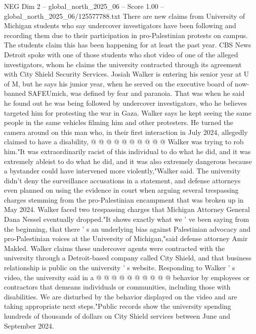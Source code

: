 \begin{textsample}{NEG Dim 2 – global\_north\_2025\_06 – Score 1.00 – global\_north\_2025\_06/125577788.txt}  \label{ex:f2_neg_085}
There are new claims from University of Michigan students who say undercover investigators have been following and recording them due to their participation in pro-Palestinian protests on campus.
The students claim this has been happening for at least the past year.
CBS News Detroit spoke with one of those students who shot video of one of the alleged investigators, whom he claims the university contracted through its agreement with City Shield Security Services.
Josiah Walker is entering his senior year at U of M, but he says his junior year, when he served on the executive board of now-banned SAFEUmich, was defined by fear and paranoia.
That was when he said he found out he was being followed by undercover investigators, who he believes targeted him for protesting the war in Gaza.
Walker says he kept seeing the same people in the same vehicles filming him and other protesters.
He turned the camera around on this man who, in their first interaction in July 2024, allegedly claimed to have a disability, @ @ @ @ @ @ @ @ @ @ Walker was trying to rob him."It was extraordinarily racist of this individual to do what he did, and it was extremely ableist to do what he did, and it was also extremely dangerous because a bystander could have intervened more violently,"Walker said.
The university didn't deny the surveillance accusations in a statement, and defense attorneys even planned on using the evidence in court when arguing several trespassing charges stemming from the pro-Palestinian encampment that was broken up in May 2024.
Walker faced two trespassing charges that Michigan Attorney General Dana Nessel eventually dropped."It shows exactly what we ' ve been saying from the beginning, that there ' s an underlying bias against Palestinian advocacy and pro-Palestinian voices at the University of Michigan,"said defense attorney Amir Makled.
Walker claims these undercover agents were contracted with the university through a Detroit-based company called City Shield, and that business relationship is public on the university ' s website.
Responding to Walker ' s video, the university said in a @ @ @ @ @ @ @ @ @ @ behavior by employees or contractors that demeans individuals or communities, including those with disabilities.
We are disturbed by the behavior displayed on the video and are taking appropriate next steps."Public records show the university spending hundreds of thousands of dollars on City Shield services between June and September 2024.

\end{textsample}
